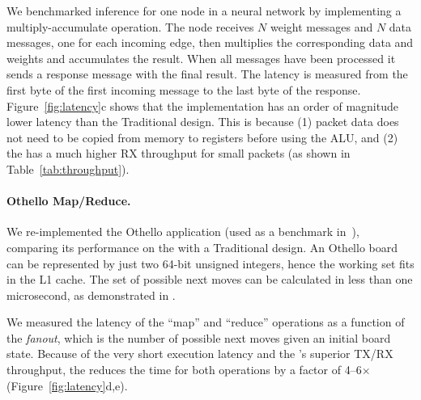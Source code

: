 We benchmarked inference for one node in a neural network by implementing a multiply-accumulate operation. The node receives $N$ weight messages and $N$ data messages, one for each incoming edge, then multiplies the corresponding data and weights and accumulates the result.
When all messages have been processed it sends a response message with the final result.
The latency is measured from the first byte of the first incoming message to the last byte of the response.
Figure~\ref{fig:latency}c shows that the \name{} implementation has an order of magnitude lower latency than the Traditional design. 
This is because (1) packet data does not need to be copied from memory to registers before using the ALU, and (2) the \name{} has a much higher RX throughput for small packets (as shown in Table~\ref{tab:throughput}).


\paragraph{Othello Map/Reduce.} We re-implemented the Othello application (used as a benchmark in~\cite{lnic}), comparing its performance on the \name{} with a Traditional design.
An Othello board can be represented by just two 64-bit unsigned integers, hence the working set fits in the L1 cache. The set of possible next moves can be calculated in less than one microsecond, as demonstrated in \cite{lnic}.

We measured the latency of the ``map'' and ``reduce'' operations as a function of the {\em fanout}, which is the number of possible next moves given an initial board state.
Because of the very short execution latency and the \name{}'s superior TX/RX throughput, the \name{} reduces the time for both operations by a factor of 4--6$\times$ (Figure~\ref{fig:latency}d,e).

%

